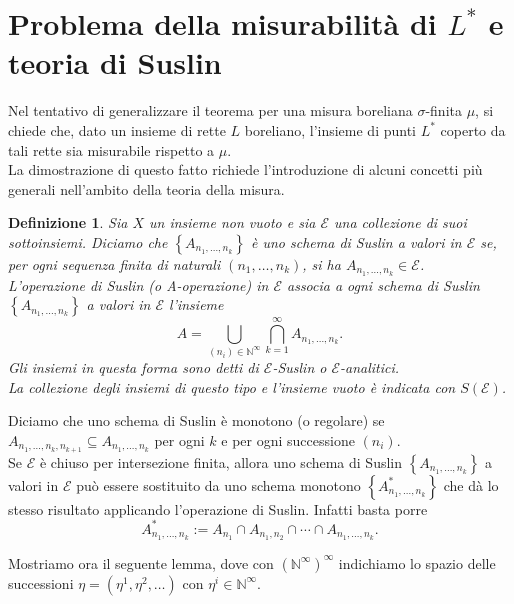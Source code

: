 \documentclass[a4paper, twoside]{article}
\newcommand{\<}{\langle}
\renewcommand{\>}{\rangle}
\newtheorem{defin}[teo]{Definizione}
\begin{document}
\newpage

\section{Problema della misurabilità di $L^*$ e teoria di Suslin}

Nel tentativo di generalizzare il teorema per una misura boreliana $\sigma$-finita $\mu$, si chiede che, dato un insieme di rette $L$ boreliano, l'insieme di punti $L^*$ coperto da tali rette sia misurabile rispetto a $\mu$.\\
La dimostrazione di questo fatto richiede l'introduzione di alcuni concetti più generali nell'ambito della teoria della misura.

\begin{defin}
	Sia $X$ un insieme non vuoto e sia $\mathcal{E}$ una collezione di suoi sottoinsiemi. Diciamo che $\left\{A_{n_{1}, \ldots, n_{k}}\right\}$ è uno schema di Suslin a valori in $\mathcal{E}$ se, per ogni sequenza finita di naturali $\left(n_{1}, \ldots, n_{k}\right)$, si ha $A_{n_{1}, \ldots, n_{k}} \in \mathcal{E}$.\\
	L'operazione di Suslin (o A-operazione) in $\mathcal{E}$ associa a ogni schema di Suslin $\left\{A_{n_{1}, \ldots, n_{k}}\right\}$ a valori in $\mathcal{E}$ l'insieme
	$$
	A=\bigcup_{\left(n_{i}\right) \in \mathbb{N}^{\infty}} \bigcap_{k=1}^{\infty} A_{n_{1}, \ldots, n_{k}} .
	$$
	Gli insiemi in questa forma sono detti di $\mathcal{E}$-Suslin o $\mathcal{E}$-analitici. \\
	La collezione degli insiemi di questo tipo e l'insieme vuoto è indicata con $S(\mathcal{E})$.
\end{defin}	

Diciamo che uno schema di Suslin è monotono (o regolare) se $A_{n_{1}, \ldots, n_{k}, n_{k+1}} \subseteq A_{n_{1}, \ldots, n_{k}}$ per ogni $k$ e per ogni successione $(n_i)$.\\
Se $\mathcal{E}$ è chiuso per intersezione finita, allora uno schema di Suslin $\left\{A_{n_{1}, \ldots, n_{k}}\right\}$ a valori in $\mathcal{E}$ può essere sostituito da uno schema monotono $\left\{A^*_{n_{1}, \ldots, n_{k}}\right\}$ che dà lo stesso risultato applicando l'operazione di Suslin. Infatti basta porre 
$$
A_{n_{1}, \ldots, n_{k}}^{*}:=A_{n_{1}} \cap A_{n_{1}, n_{2}} \cap \cdots \cap A_{n_{1}, \ldots, n_{k}} .
$$

Mostriamo ora il seguente lemma, dove con $\left(\mathbb{N}^{\infty}\right)^{\infty}$ indichiamo lo spazio delle successioni $\eta=\left(\eta^{1}, \eta^{2}, \ldots\right)$ con $\eta^{i} \in \mathbb{N}^{\infty}$.
\end{document}
